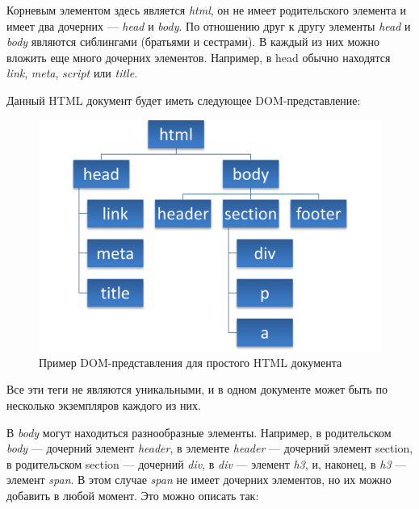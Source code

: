 
Корневым элементом здесь является \textit{html}, он не имеет родительского элемента и имеет два дочерних --- \textit{head} и \textit{body}. По отношению друг к другу элементы \textit{head} и \textit{body} являются сиблингами (братьями и сестрами). В каждый из них можно вложить еще много дочерних элементов. Например, в head обычно находятся \textit{link}, \textit{meta}, \textit{script} или \textit{title}.

Данный HTML документ будет иметь следующее DOM-представление:
 \clearpage

\begin{figure}[h]
	\centering
	\includegraphics[width=150mm]{img/simple-dom-1.png}
	\caption{Пример DOM-представления для простого HTML документа}
	\label{fig:simple-dom-1}
\end{figure}

Все эти теги не являются уникальными, и в одном документе может быть по несколько экземпляров каждого из них.

В \textit{body} могут находиться разнообразные элементы. 
Например, в родительском \textit{body} --- дочерний элемент \textit{header}, в элементе \textit{header} --- дочерний элемент section, в родительском section --- дочерний \textit{div}, в \textit{div} --- элемент \textit{h3}, и, наконец, в \textit{h3} — элемент \textit{span}. 
В этом случае \textit{span} не имеет дочерних элементов, но их можно добавить в любой момент.
Это можно описать так:

